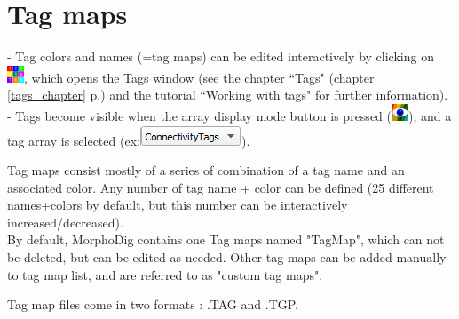 \section{Tag maps}


- Tag colors and names (=tag maps) can be edited interactively by
clicking on \includegraphics[scale=0.7]{images/07/tagmaps/tagmaps.png}, which opens the Tags window (see the chapter
``Tags" (chapter \ref{tags_chapter} p.\pageref{tags_chapter}) and the tutorial ``Working with tags" for
further information).\\
- Tags become visible when the array display mode button is pressed (\includegraphics[scale=0.7]{images/04/show_color_scale.png}), and a tag array is selected (ex:\includegraphics[scale=0.5]{images/04/scalarcombo_tag.png}).

Tag maps consist mostly of a series of combination of a tag name and an associated color.  Any number of tag name + color can be defined (25 different names+colors by default, but this number can be interactively increased/decreased).\\
By default, MorphoDig contains one Tag maps named "TagMap", which can not be deleted, but can be edited as needed. Other tag maps can be added manually to tag map list, and are referred to as "custom tag maps". 


Tag map files come in two formats : .TAG and .TGP.

